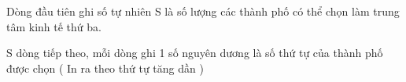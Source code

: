 Dòng đầu tiên ghi số tự nhiên S là số lượng các thành phố có thể chọn làm trung tâm kinh tế thứ ba.  

   S dòng tiếp theo, mỗi dòng ghi 1 số nguyên dương là số thứ tự của thành phố được chọn ( In ra theo thứ tự tăng dần )